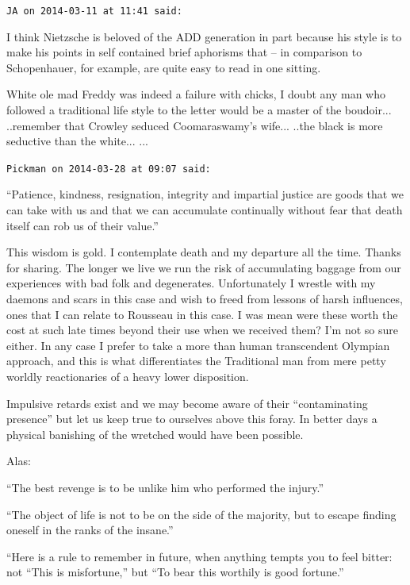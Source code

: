 \begin{footnotesize}
\begin{sffamily}

\texttt{JA on 2014-03-11 at 11:41 said:}

I think Nietzsche is beloved of the ADD generation in part because his style is to make his points in self contained brief aphorisms that -- in comparison to Schopenhauer, for example, are quite easy to read in one sitting.

White ole mad Freddy was indeed a failure with chicks, I doubt any man who followed a traditional life style to the letter would be a master of the boudoir... ..remember that Crowley seduced Coomaraswamy's wife... ..the black is more seductive than the white... ... 

\hfill

\texttt{Pickman on 2014-03-28 at 09:07 said:}

``Patience, kindness, resignation, integrity and impartial justice are goods that we can take with us and that we can accumulate continually without fear that death itself can rob us of their value.''

This wisdom is gold. I contemplate death and my departure all the time. Thanks for sharing. The longer we live we run the risk of accumulating baggage from our experiences with bad folk and degenerates. Unfortunately I wrestle with my daemons and scars in this case and wish to freed from lessons of harsh influences, ones that I can relate to Rousseau in this case. I was mean were these worth the cost at such late times beyond their use when we received them? I'm not so sure either. In any case I prefer to take a more than human transcendent Olympian approach, and this is what differentiates the Traditional man from mere petty worldly reactionaries of a heavy lower disposition.

Impulsive retards exist and we may become aware of their ``contaminating presence'' but let us keep true to ourselves above this foray. In better days a physical banishing of the wretched would have been possible.

Alas:

``The best revenge is to be unlike him who performed the injury.''

``The object of life is not to be on the side of the majority, but to escape finding oneself in the ranks of the insane.''

``Here is a rule to remember in future, when anything tempts you to feel bitter: not ``This is misfortune,'' but ``To bear this worthily is good fortune.''


\end{sffamily}
\end{footnotesize}
